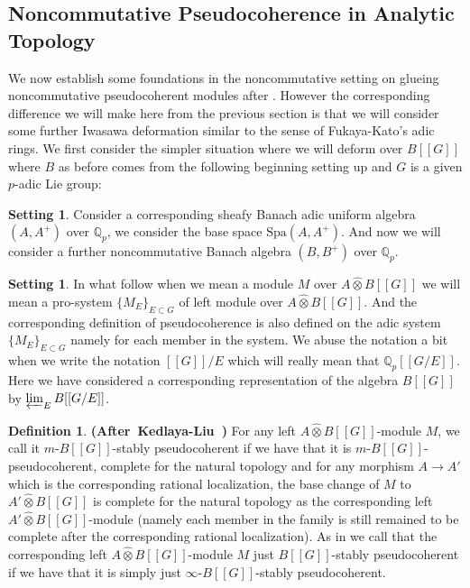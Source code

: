 \documentclass[12pt]{amsart}
\theoremstyle{definition}
\newtheorem{definition}[theorem]{Definition}
\numberwithin{equation}{section}
\newtheorem{setting}[theorem]{Setting}
\begin{document}
\subsection{Noncommutative Pseudocoherence in Analytic Topology}


\indent We now establish some foundations in the noncommutative setting on glueing noncommutative pseudocoherent modules after \cite[Chapter 2]{KL2}. However the corresponding difference we will make here from the previous section is that we will consider some further Iwasawa deformation similar to the sense of Fukaya-Kato's adic rings. We first consider the simpler situation where we will deform over $B[[G]]$ where $B$ as before comes from the following beginning setting up and $G$ is a given $p$-adic Lie group:


\begin{setting} \label{setting3.1}
Consider a corresponding sheafy Banach adic uniform algebra $(A,A^+)$ over $\mathbb{Q}_p$, we consider the base space $\mathrm{Spa}(A,A^+)$. And now we will consider a further noncommutative Banach algebra $(B,B^+)$ over $\mathbb{Q}_p$. 	
\end{setting}



\begin{setting}
In what follow when we mean a module $M$ over $A\widehat{\otimes}B[[G]]$ we will mean a pro-system $\{M_E\}_{E\subset G}$ of left module over $A\widehat{\otimes}B[[G]]$. And the corresponding definition of pseudocoherence is also defined on the adic system $\{M_E\}_{E\subset G}$ namely for each member in the system. We abuse the notation a bit when we write the notation $[[G]]/E$ which will really mean that $\mathbb{Q}_p[[G/E]]$. Here we have considered a corresponding representation of the algebra $B[[G]]$ by $\varprojlim_{E} B[[G/E]]$.	
\end{setting}



\begin{definition} \mbox{\bf{(After Kedlaya-Liu \cite[Definition 2.4.1]{KL2})}}
For any left $A\widehat{\otimes}B[[G]]$-module $M$, we call it $m$-$B[[G]]$-stably pseudocoherent if we have that it is $m$-$B[[G]]$-pseudocoherent, complete for the natural topology and for any morphism $A\rightarrow A'$ which is the corresponding rational localization, the base change of $M$ to $A'\widehat{\otimes} B[[G]]$ is complete for the natural topology as the corresponding left $A'\widehat{\otimes} B[[G]]$-module (namely each member in the family is still remained to be complete after the corresponding rational localization). As in \cite[Definition 2.4.1]{KL2} we call that the corresponding left $A\widehat{\otimes}B[[G]]$-module $M$ just $B[[G]]$-stably pseudocoherent if we have that it is simply just $\infty$-$B[[G]]$-stably pseudocoherent.
\end{definition}
\end{document}
